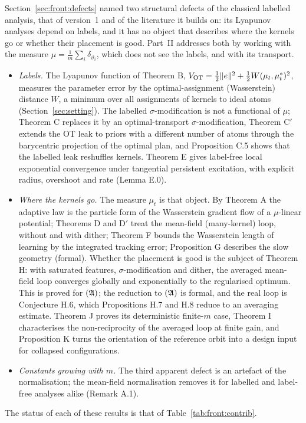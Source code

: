 Section~\ref{sec:front:defects} named two structural defects of the classical labelled analysis, that of version~1 and
of the literature it builds on: its Lyapunov analyses depend on labels, and it has no object that describes where the
kernels go or whether their placement is good. Part~II addresses both by working with the measure
$\mu = \frac1m\sum_i\delta_{\vartheta_i}$, which does not see the labels, and with its transport.
\begin{itemize}
  \item \emph{Labels.} The Lyapunov function of Theorem B, $V_{\mathrm{OT}} = \frac12\lVert e\rVert^2 + \frac12 W(\mu_t,\mu_t^*)^2$,
    measures the parameter error by the optimal-assignment (Wasserstein) distance $W$, a minimum over all
    assignments of kernels to ideal atoms (Section~\ref{sec:setting}). The labelled $\sigma$-modification is not a
    functional of $\mu$; Theorem C replaces it by an optimal-transport $\sigma$-modification, Theorem C$'$ extends
    the OT leak to priors with a different number of atoms through the barycentric projection of the optimal plan,
    and Proposition C.5 shows that the labelled leak reshuffles kernels. Theorem E gives label-free local exponential
    convergence under tangential persistent excitation, with explicit radius, overshoot and rate (Lemma E.0).
  \item \emph{Where the kernels go.} The measure $\mu_t$ is that object. By Theorem A the adaptive law is the
    particle form of the Wasserstein gradient flow of a $\mu$-linear potential; Theorems D and D$'$ treat the
    mean-field (many-kernel) loop, without and with dither; Theorem F bounds the Wasserstein length of learning by
    the integrated tracking error;
    Proposition G describes the slow geometry (formal). Whether the placement is good is the subject of Theorem H: with saturated features,
    $\sigma$-modification and dither, the averaged mean-field loop converges globally and exponentially to the
    regularised optimum. This is proved for $(\mathfrak{A})$; the reduction to $(\mathfrak{A})$ is formal, and the real loop is
    Conjecture H.6, which Propositions H.7 and H.8 reduce to an averaging estimate. Theorem J proves its
    deterministic finite-$m$ case, Theorem I characterises the non-reciprocity of the averaged loop at finite gain,
    and Proposition K turns the orientation of the reference orbit into a design input for collapsed
    configurations.
  \item \emph{Constants growing with $m$.} The third apparent defect is an artefact of the normalisation; the
    mean-field normalisation removes it for labelled and label-free analyses alike (Remark A.1).
\end{itemize}
The status of each of these results is that of Table~\ref{tab:front:contrib}.

